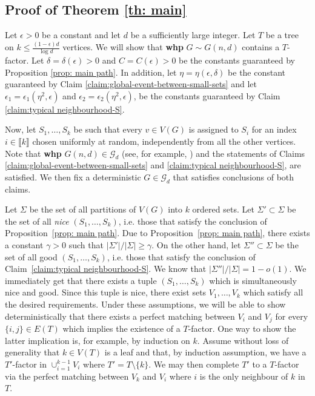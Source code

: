 \documentclass[notitlepage]{scrartcl}
\newcommand{\br}[1]{\llbracket{#1}\rrbracket}
\begin{document}
\subsection{Proof of Theorem \ref{th: main}}\label{subsection:proof-of-main-thm}
Let $\epsilon > 0$ be a constant and let $d$ be a sufficiently large integer. Let $T$ be a tree on $k\le \frac{(1-\epsilon)d}{\log d}$ vertices. We will show that \textbf{whp} $G \sim G(n, d)$ contains a $T$-factor. Let $\delta = \delta(\epsilon) > 0$ and $C = C(\epsilon) > 0$ be the constants guaranteed by Proposition \ref{prop: main path}. In addition, let $\eta = \eta(\epsilon, \delta)$ be the constant guaranteed by Claim \ref{claim:global-event-between-small-sets} and let $\epsilon_1 = \epsilon_1(\eta^2,\epsilon)$ and $\epsilon_2 = \epsilon_2(\eta^2,\epsilon)$, be the constants guaranteed by Claim \ref{claim:typical neighbourhood-S}.

Now, let $S_1,\ldots, S_k$ be such that every $v\in V(G)$ is assigned to $S_i$ for an index $i\in \br{k}$ chosen uniformly at random, independently from all the other vertices. Note that \textbf{whp} $G(n,d)\in \mathcal{G}_d$ (see, for example, \cite{W99}) and the statements of Claims \ref{claim:global-event-between-small-sets} and \ref{claim:typical neighbourhood-S}, are satisfied. We then fix a deterministic $G\in \mathcal{G}_d$ that satisfies conclusions of both claims.

Let $\Sigma$ be the set of all partitions of $V(G)$ into $k$ ordered sets. Let $\Sigma'\subset\Sigma$ be the set of all \emph{nice} $(S_1,\ldots,S_k)$, i.e. those that satisfy the conclusion of Proposition~\ref{prop: main path}. Due to Proposition~\ref{prop: main path}, there exists a constant $\gamma>0$ such that $|\Sigma'|/|\Sigma|\geq\gamma$. On the other hand, let $\Sigma''\subset\Sigma$ be the set of all good $(S_1,\ldots,S_k)$, i.e. those that satisfy the conclusion of Claim~\ref{claim:typical neighbourhood-S}. We know that $|\Sigma''|/|\Sigma|=1-o(1)$. We immediately get that there exists a tuple $(S_1,\ldots,S_k)$ which is simultaneously nice and good. Since this tuple is nice,
 there exist sets $V_1, \dots, V_k$ which satisfy all the desired requirements. Under these assumptions, we will be able to show deterministically that there exists a perfect matching between $V_i$ and $V_j$ for every $\{i,j\} \in E(T)$ which implies the existence of a $T$-factor. One way to show the latter implication is, for example, by induction on $k$. Assume without loss of generality that $k \in V(T)$ is a leaf and that, by induction assumption, we have a $T'$-factor in $\cup_{i=1}^{k-1} V_i$ where $T' = T \setminus \{k\}$. We may then complete $T'$ to a $T$-factor via the perfect matching between $V_k$ and $V_i$ where $i$ is the only neighbour of $k$ in $T$.
\end{document}

